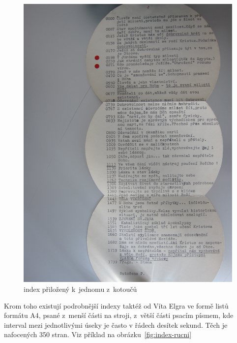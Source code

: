 \begin{figure}[htpb]
\includegraphics[scale=0.192]{rc/index-kotouc.jpg}
\caption{index přiložený k~jednomu z~kotoučů}
\label{fig:index-kotouc}
\end{figure}

Krom toho existují podrobnější indexy taktéž od Víta Elgra ve formě listů
formátu A4, psané z~menší části na stroji, z~větší části psacím písmem, kde
interval mezi jednotlivými úseky je často v řádech desítek sekund. Těch je
nafocených 350 stran. Viz příklad na obrázku~\ref{fig:index-rucni}

